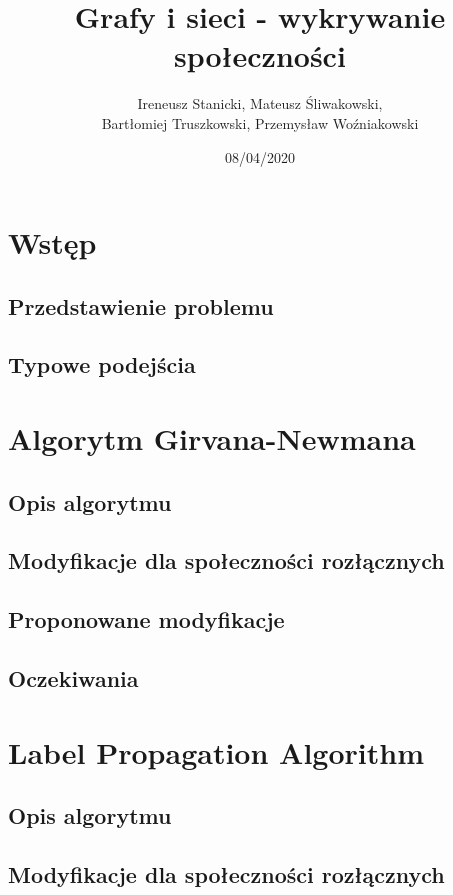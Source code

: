 \documentclass{article}
\title{Grafy i sieci - wykrywanie społeczności}
\date{08/04/2020}
\author{Ireneusz Stanicki, Mateusz Śliwakowski,\\Bartłomiej Truszkowski, Przemysław Woźniakowski}
\begin{document}
	\begin{titlingpage}
		\maketitle
	\end{titlingpage}
	
\section{Wstęp}
\subsection{Przedstawienie problemu}
\subsection{Typowe podejścia}

\newpage
\section{Algorytm Girvana-Newmana}
\subsection{Opis algorytmu}
\subsection{Modyfikacje dla społeczności rozłącznych}
\subsection{Proponowane modyfikacje}
\subsection{Oczekiwania}

\newpage
\section{Label Propagation Algorithm}
\subsection{Opis algorytmu}
\subsection{Modyfikacje dla społeczności rozłącznych}
\end{document}
